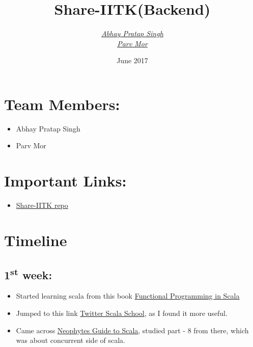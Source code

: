 \documentclass{article}
\title{Share-IITK(Backend)}
\author{\href{mailto:abhays@iitk.ac.in}{\textit{Abhay Pratap Singh}}
        \\
        \href{mailto:parv@iitk.ac.in}{\textit{Parv Mor}}}
\date{June 2017}
\begin{document}
\maketitle
\section*{Team Members:}
\begin{itemize}
    \item Abhay Pratap Singh
    \item Parv Mor
\end{itemize}
\section*{Important Links:}
\begin{itemize}
    \item \href{https://github.com/abhayptp/share-iitk}{Share-IITK repo}
\end{itemize}
\section*{\textbf{Timeline}}
\subsection*{1\textsuperscript{st} week:}
\begin{itemize}
     \item Started learning scala from this book \href{https://www.manning.com/books/functional-programming-in-scala}{Functional Programming in Scala}
    \item Jumped to this link \href{https://twitter.github.io/scala_school/}{Twitter Scala School}, as I found it more useful.
    \item Came across \href{http://danielwestheide.com/scala/neophytes.html}{Neophytes Guide to Scala}, studied part - 8 from there, which was about concurrent side of scala.
\end{itemize}
\end{document}
